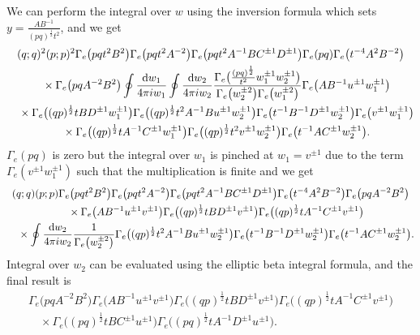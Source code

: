 \documentclass[a4paper,12pt]{article}
\begin{document}
We can perform the integral over $w$ using the inversion formula which sets $y=\frac{AB^{-1}}{(pq)^\frac12t^2}$, and we get
\begin{gather*}
(q;q)^2(p;p)^2\Gamma_e\big(pqt^2B^2\big)\Gamma_e\big(pqt^2A^{-2}\big)\Gamma_e\big(pqt^2A^{-1}BC^{\pm1}D^{\pm1}\big)
\Gamma_e(pq)\Gamma_e\big(t^{-4}A^2B^{-2}\big)\\
\quad{}\times \Gamma_e\big(pqA^{-2}B^2\big)
\oint\frac{{\rm d}w_1}{4\pi i w_1}\oint \frac{{\rm d}w_2}{4\pi i w_2} \frac{\Gamma_e\big(\frac{(p q)^{\frac12}}{t^2}w_1^{\pm1}w_2^{\pm1}\big)}{\Gamma_e\big(w_2^{\pm2}\big)\Gamma_e\big(w_1^{\pm2}\big)} \Gamma_e\big( AB^{-1} u^{\pm1} w_1^{\pm1}\big)\\
\quad {} \times \Gamma_e\big((qp)^{\frac12}t BD^{\pm1} w_1^{\pm1}\big)\Gamma_e\big((q p)^{\frac12} t^2 A^{-1} B u^{\pm1} w_2^{\pm1}\big) \Gamma_e \big(t^{-1} B^{-1} D^{\pm1}w_2^{\pm1}\big) \Gamma_e\big( v^{\pm1} w_1^{\pm1}\big)\\
\quad{} \times\Gamma_e\big((q p)^{\frac12}t A^{-1} C^{\pm1} w_1^{\pm1}\big) \Gamma_e\big( (q p)^{\frac12} t^2 v^{\pm1} w_2^{\pm1}\big) \Gamma_e\big( t^{-1} A C^{\pm1} w_2^{\pm1}\big) .
\end{gather*}
$\Gamma_e(pq)$ is zero but the integral over $w_1$ is pinched at $w_1=v^{\pm1}$ due to the term $\Gamma_e(v^{\pm1}w_1^{\pm1})$ such that the multiplication is finite and we get
\begin{gather*}
(q;q)(p;p) \Gamma_e\big(pqt^2B^2\big)\Gamma_e\big(pqt^2A^{-2}\big)\Gamma_e\big(pqt^2A^{-1}BC^{\pm1}D^{\pm1}\big)
\Gamma_e\big(t^{-4}A^2B^{-2}\big)\Gamma_e\big(pqA^{-2}B^2\big)\\
\quad{} \times\Gamma_e\big( AB^{-1} u^{\pm1} v^{\pm1}\big)\Gamma_e\big((qp)^{\frac12}t BD^{\pm1} v^{\pm1}\big)
\Gamma_e\big((q p)^{\frac12}t A^{-1} C^{\pm1} v^{\pm1}\big)\\
\quad{} \times\oint \frac{{\rm d}w_2}{4\pi i w_2} \frac{1}{\Gamma_e\big(w_2^{\pm2}\big)}
\Gamma_e\big((q p)^{\frac12} t^2 A^{-1} B u^{\pm1} w_2^{\pm1}\big) \Gamma_e \big(t^{-1} B^{-1} D^{\pm1}w_2^{\pm1}\big)
\Gamma_e\big( t^{-1} A C^{\pm1} w_2^{\pm1}\big) .
\end{gather*}
Integral over $w_2$ can be evaluated using the elliptic beta integral formula, and the final result is
\begin{gather*}
\Gamma_e\big(pqA^{-2}B^2\big) \Gamma_e\big( AB^{-1} u^{\pm1} v^{\pm1}\big)\Gamma_e\big((qp)^{\frac12}t BD^{\pm1} v^{\pm1}\big)
\Gamma_e\big((q p)^{\frac12}t A^{-1} C^{\pm1} v^{\pm1}\big)\\
\quad{}\times \Gamma_e\big((pq)^\frac12 t B C^{\pm1}u^{\pm1}\big) \Gamma_e\big((pq)^\frac12 t A^{-1}D^{\pm1}u^{\pm1}\big) .
\end{gather*}
\end{document}
